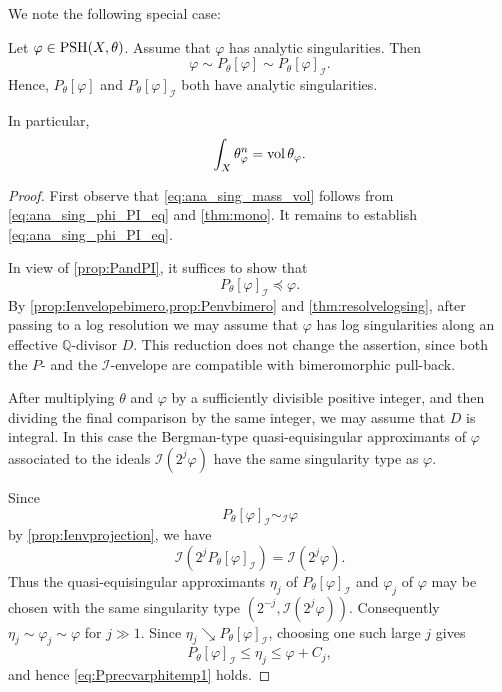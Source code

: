 We note the following special case:
\begin{proposition}\label{prop:analysingcompPandPI}
    Let $\varphi\in \mathrm{PSH}(X,\theta)$. Assume that $\varphi$ has analytic singularities. Then
    \begin{equation}\label{eq:ana_sing_phi_PI_eq}
        \varphi\sim P_{\theta}[\varphi] \sim P_{\theta}[\varphi]_{\mathcal{I}}.
    \end{equation}
    Hence, $P_{\theta}[\varphi]$ and $P_{\theta}[\varphi]_{\mathcal{I}}$ both have analytic singularities.

    In particular,
    \begin{equation}\label{eq:ana_sing_mass_vol}
        \int_X \theta_{\varphi}^n= \operatorname{vol} \theta_{\varphi}.
    \end{equation}
\end{proposition}
\begin{proof}
    First observe that \eqref{eq:ana_sing_mass_vol} follows from \eqref{eq:ana_sing_phi_PI_eq} and \cref{thm:mono}. It remains to establish \eqref{eq:ana_sing_phi_PI_eq}.

    In view of \cref{prop:PandPI}, it suffices to show that
    \begin{equation}\label{eq:Pprecvarphitemp1}
        P_{\theta}[\varphi]_{\mathcal{I}}\preceq \varphi.
    \end{equation}
    By \cref{prop:Ienvelopebimero,prop:Penvbimero} and \cref{thm:resolvelogsing}, after passing to a log resolution we may assume that $\varphi$ has log singularities along an effective $\mathbb Q$-divisor $D$. This reduction does not change the assertion, since both the $P$- and the $\mathcal I$-envelope are compatible with bimeromorphic pull-back.

    After multiplying $\theta$ and $\varphi$ by a sufficiently divisible positive integer, and then dividing the final comparison by the same integer, we may assume that $D$ is integral. In this case the Bergman-type quasi-equisingular approximants of $\varphi$ associated to the ideals $\mathcal I(2^j\varphi)$ have the same singularity type as $\varphi$.

    Since
    \[
        P_\theta[\varphi]_{\mathcal I}\sim_{\mathcal I}\varphi
    \]
    by \cref{prop:Ienvprojection}, we have
    \[
        \mathcal I(2^jP_\theta[\varphi]_{\mathcal I})=\mathcal I(2^j\varphi).
    \]
    Thus the quasi-equisingular approximants $\eta_j$ of $P_\theta[\varphi]_{\mathcal I}$ and $\varphi_j$ of $\varphi$ may be chosen with the same singularity type $(2^{-j},\mathcal I(2^j\varphi))$.
    Consequently $\eta_j\sim\varphi_j\sim\varphi$ for $j\gg1$. Since $\eta_j\searrow P_\theta[\varphi]_{\mathcal I}$, choosing one such large $j$ gives
    \[
        P_\theta[\varphi]_{\mathcal I}\leq \eta_j\leq \varphi+C_j,
    \]
    and hence \eqref{eq:Pprecvarphitemp1} holds.
\end{proof}




